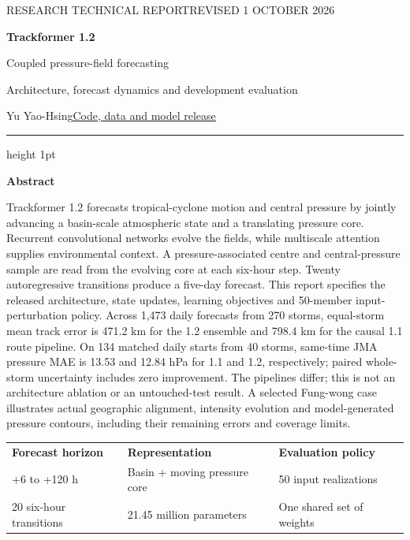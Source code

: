 \documentclass[10pt,letterpaper]{article}
\begin{document}
\fontsize{10.3}{13}\selectfont
\thispagestyle{empty}
{\sffamily\small\color{modelteal}RESEARCH TECHNICAL REPORT\hfill REVISED 1 OCTOBER 2026\par}
\vspace{13pt}
{\sffamily\bfseries\color{ink}\fontsize{26}{29}\selectfont Trackformer 1.2\par}
\vspace{4pt}
{\sffamily\color{ink}\fontsize{17}{21}\selectfont Coupled pressure-field forecasting\par}
\vspace{6pt}
{\large Architecture, forecast dynamics and development evaluation\par}
\vspace{10pt}
{\sffamily\small Yu Yao-Hsing\hfill\href{https://github.com/yu314-coder/typhoon-predict}{Code, data and model release}\par}
\vspace{8pt}
{\color{modelteal}\hrule height 1pt}
\vspace{10pt}
{\sffamily\bfseries\color{ink}Abstract\par}
Trackformer 1.2 forecasts tropical-cyclone motion and central pressure by
jointly advancing a basin-scale atmospheric state and a translating pressure
core. Recurrent convolutional networks evolve the fields, while multiscale
attention supplies environmental context. A pressure-associated centre and
central-pressure sample are read from the evolving core at each six-hour
step. Twenty autoregressive transitions produce a five-day forecast.
This report specifies the released architecture, state updates, learning
objectives and 50-member input-perturbation policy. Across 1,473 daily forecasts
from 270 storms, equal-storm mean track error is 471.2 km for the 1.2 ensemble
and 798.4 km for the causal 1.1 route pipeline.
On 134 matched daily starts from 40 storms, same-time JMA pressure MAE
is 13.53 and 12.84 hPa for 1.1 and 1.2, respectively; paired
whole-storm uncertainty includes zero improvement.
The pipelines differ; this is not an architecture ablation or an untouched-test
result. A selected Fung-wong case illustrates actual geographic alignment,
intensity evolution and model-generated pressure contours, including their
remaining errors and coverage limits.

\vspace{5pt}
\begin{tabularx}{\linewidth}{@{}XXX@{}}
\toprule
\sffamily\bfseries Forecast horizon & \sffamily\bfseries Representation & \sffamily\bfseries Evaluation policy\\
+6 to +120 h & Basin + moving pressure core & 50 input realizations\\
20 six-hour transitions & 21.45 million parameters & One shared set of weights\\
\bottomrule
\end{tabularx}
\end{document}
